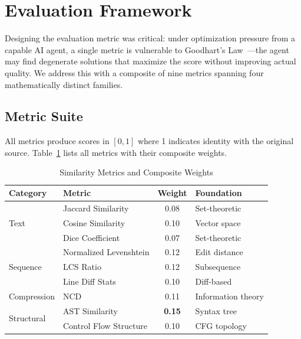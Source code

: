 \documentclass[conference,11pt]{IEEEtran}
\begin{document}
\section{Evaluation Framework}
\label{sec:metrics}

Designing the evaluation metric was critical: under optimization pressure from a capable AI agent, a single metric is vulnerable to Goodhart's Law~\cite{goodhart}---the agent may find degenerate solutions that maximize the score without improving actual quality. We address this with a composite of nine metrics spanning four mathematically distinct families.

\subsection{Metric Suite}

All metrics produce scores in $[0, 1]$ where 1 indicates identity with the original source. Table~\ref{tab:metrics} lists all metrics with their composite weights.

\begin{table}[t]
\centering
\caption{Similarity Metrics and Composite Weights}
\label{tab:metrics}
\scriptsize
\setlength{\tabcolsep}{3pt}
\begin{tabular}{@{}p{}p{}cp{}@{}}
\toprule
\textbf{Category} & \textbf{Metric} & \textbf{Weight} & \textbf{Foundation} \\
\midrule
\multirow{3}{*}{Text}
    & Jaccard Similarity & 0.08 & Set-theoretic \\
    & Cosine Similarity & 0.10 & Vector space \\
    & Dice Coefficient & 0.07 & Set-theoretic \\
\midrule
\multirow{3}{*}{Sequence}
    & Normalized Levenshtein & 0.12 & Edit distance \\
    & LCS Ratio & 0.12 & Subsequence \\
    & Line Diff Stats & 0.10 & Diff-based \\
\midrule
Compression
    & NCD & 0.11 & Information theory \\
\midrule
\multirow{2}{*}{Structural}
    & AST Similarity & \textbf{0.15} & Syntax tree \\
    & Control Flow Structure & 0.10 & CFG topology \\
\bottomrule
\end{tabular}
\end{table}
\end{document}
